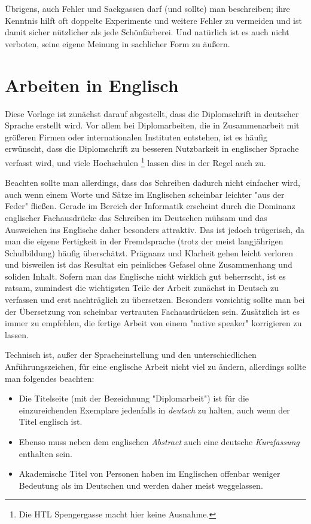 Übrigens, auch Fehler und Sackgassen darf (und sollte) man
beschreiben; ihre Kenntnis hilft oft doppelte Experimente und
weitere Fehler zu vermeiden und ist damit sicher nützlicher als
jede Schönfärberei.
Und natürlich ist es auch nicht verboten, seine eigene Meinung 
in sachlicher Form zu äußern.


\section{Arbeiten in Englisch}
\label{sec:englisch}

Diese Vorlage ist zunächst darauf abgestellt, dass die
Diplomschrift in deutscher Sprache erstellt wird. Vor allem bei
Diplomarbeiten, die in Zusammenarbeit mit größeren Firmen oder
internationalen Instituten entstehen, ist es häufig erwünscht,
dass die Diplomschrift zu besseren Nutzbarkeit in englischer
Sprache verfasst wird, und viele Hochschulen%
\footnote{Die HTL Spengergasse macht hier keine Ausnahme.
} 
lassen dies in der Regel auch zu.

Beachten sollte man allerdings, dass das Schreiben dadurch nicht
einfacher wird, auch wenn einem Worte und Sätze im Englischen
scheinbar leichter "aus der Feder" fließen. Gerade im Bereich
der Informatik erscheint durch die Dominanz englischer
Fachausdrücke das Schreiben im Deutschen mühsam und das Ausweichen
ins Englische daher besonders attraktiv. Das ist jedoch
trügerisch, da man die eigene Fertigkeit in der Fremdsprache
(trotz der meist langjährigen Schulbildung) häufig überschätzt.
Prägnanz und Klarheit gehen leicht verloren und bisweilen ist das
Resultat ein peinliches Gefasel ohne Zusammenhang und soliden
Inhalt. Sofern man das Englische nicht wirklich gut beherrscht, ist
es ratsam, zumindest die wichtigsten Teile der Arbeit zunächst in
Deutsch zu verfassen und erst nachträglich zu übersetzen.
Besonders vorsichtig sollte man bei der Übersetzung von scheinbar
vertrauten Fachausdrücken sein. Zusätzlich ist es immer zu
empfehlen, die fertige Arbeit von einem "native speaker"
korrigieren zu lassen.


Technisch ist, außer der Spracheinstellung und den unterschiedlichen Anfüh\-rungszeichen, für eine englische Arbeit nicht viel zu ändern, allerdings sollte man folgendes beachten:
%
\begin{itemize}
\item  Die Titelseite (mit der Bezeichnung "Diplomarbeit") 
ist für die einzureichenden Exemplare jedenfalls in \emph{deutsch} zu halten,
auch wenn der Titel englisch ist. 
\item Ebenso muss neben dem
englischen \emph{Abstract} auch eine deutsche \emph{Kurzfassung}
enthalten sein. %
\item Akademische Titel von Personen haben im Englischen offenbar
weniger Bedeutung als im Deutschen und werden daher meist
weggelassen.
\end{itemize}
